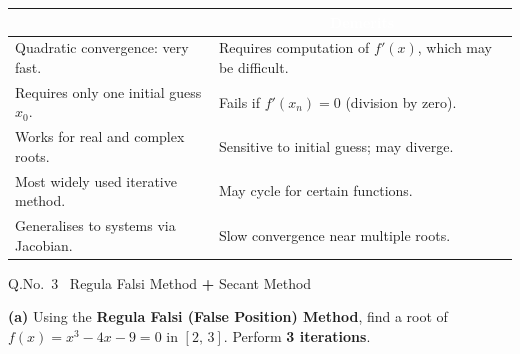 \documentclass[12pt]{article}
\begin{document}
\begin{ansbox}
\begin{center}
\begin{tabular}{|p{7.5cm}|p{7.5cm}|}
\hline
\rowcolor{primary!80}\multicolumn{1}{|c|}{\textcolor{white}{\textbf{Merits}}} & \multicolumn{1}{c|}{\textcolor{white}{\textbf{Demerits}}}\\
\hline
Quadratic convergence: very fast. & Requires computation of $f'(x)$, which may be difficult.\\[4pt]
Requires only one initial guess $x_0$. & Fails if $f'(x_n) = 0$ (division by zero).\\[4pt]
Works for real and complex roots. & Sensitive to initial guess; may diverge.\\[4pt]
Most widely used iterative method. & May cycle for certain functions.\\[4pt]
Generalises to systems via Jacobian. & Slow convergence near multiple roots.\\
\hline
\end{tabular}
\end{center}
\end{ansbox}

\newpage

\begin{qbox}{Q.No.\ 3 \textemdash\ Regula Falsi Method \textbf{+} Secant Method}
\end{qbox}

\medskip
\textbf{(a)} Using the \textbf{Regula Falsi (False Position) Method}, find a root of $f(x) = x^3 - 4x - 9 = 0$ in $[2,\,3]$. Perform \textbf{3 iterations}.
\end{document}
